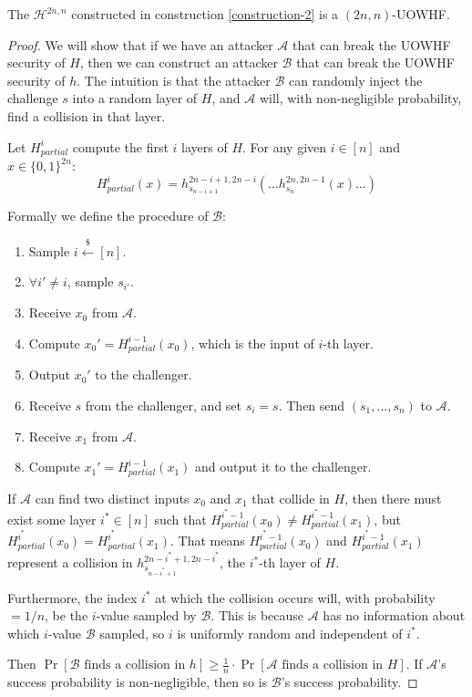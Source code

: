 \documentclass[12pt]{tufte-book}
\newcommand{\cA}{\mathcal{A}}
\newcommand{\cB}{\mathcal{B}}
\newcommand{\getsr}{\xleftarrow{\$}}
\newcommand{\bit}{\{0,1\}}
\begin{document}
\begin{claim}
    The $\mathcal{H}^{2n, n}$ constructed in construction \ref{construction-2} is a $(2n, n)$-UOWHF.
\end{claim}
\begin{proof}
    We will show that if we have an attacker $\mathcal{A}$ that can break the UOWHF security of $H$, then we can construct an attacker $\mathcal{B}$ that can break the UOWHF security of $h$. The intuition is that the attacker $\mathcal{B}$ can randomly inject the challenge $s$ into a random layer of $H$, and $\mathcal{A}$ will, with non-negligible probability, find a collision in that layer.

    Let $H_{partial}^i$ compute the first $i$ layers of $H$. For any given $i \in [n]$ and $x \in \bit^{2n}$:
    \[H_{partial}^i(x) = h_{s_{n-i+1}}^{2n-i+1, 2n-i}( \dots h_{s_n}^{2n, 2n-1}(x) \dots )\]

    Formally we define the procedure of $\mathcal{B}$:
    \begin{enumerate}
        \item Sample $i \getsr [n]$.
        \item $\forall i'\neq i$, sample $s_{i'}$.
        \item Receive $x_0$ from $\mathcal{A}$.
        \item Compute $x_0' = H_{partial}^{i-1}(x_0)$, which is the input of $i$-th layer.
        \item Output $x_0'$ to the challenger.
        \item Receive $s$ from the challenger, and set $s_i = s$. Then send $(s_1,\dots,s_n)$ to $\mathcal{A}$.
        \item Receive $x_1$ from $\mathcal{A}$.
        \item Compute $x_1' = H_{partial}^{i-1}(x_1)$ and output it to the challenger.
    \end{enumerate}

If $\mathcal{A}$ can find two distinct inputs $x_0$ and $x_1$ that collide in $H$, then there must exist some layer $i^* \in [n]$ such that $H_{partial}^{i^*-1}(x_0) \neq H_{partial}^{i^*-1}(x_1)$, but $H_{partial}^{i^*}(x_0) = H_{partial}^{i^*}(x_1)$. That means $H_{partial}^{i^*-1}(x_0)$ and $H_{partial}^{i^*-1}(x_1)$ represent a collision in $h_{s_{n-i^*+1}}^{2n-i^*+1, 2n-i^*}$, the $i^*$-th layer of $H$. 

Furthermore, the index $i^*$ at which the collision occurs will, with probability $= 1/n$, be the $i$-value sampled by $\cB$. This is because $\cA$ has no information about which $i$-value $\cB$ sampled, so $i$ is uniformly random and independent of $i^*$.

Then $\Pr[\cB \text{ finds a collision in } h] \geq \frac{1}{n} \cdot \Pr[\cA \text{ finds a collision in } H]$. If $\cA$'s success probability is non-negligible, then so is $\cB$'s success probability. 
\end{proof}
\vspace{5mm}
\end{document}
